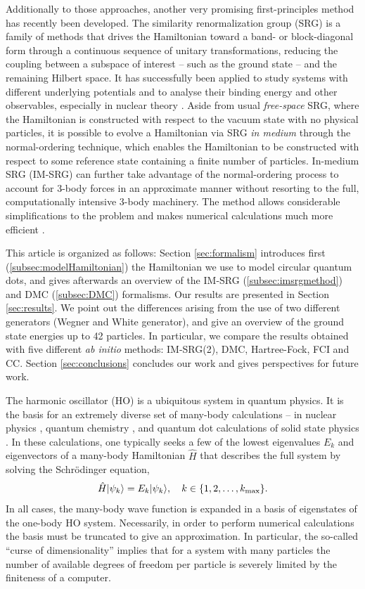 Additionally to those approaches, another very promising first-principles
method has recently been developed.  The similarity renormalization group
(SRG) is a family of methods that drives the Hamiltonian toward a band- or
block-diagonal form through a continuous sequence of unitary transformations,
reducing the coupling between a subspace of interest -- such as the ground
state -- and the remaining Hilbert space.  It has successfully been applied to
study systems with different underlying potentials and to analyse their
binding energy and other observables, especially in nuclear theory
\cite{ScottSRG,PhysRevC.75.061001,SRGThreeDim}.  Aside from usual
\emph{free-space} SRG, where the Hamiltonian is constructed with respect to
the vacuum state with no physical particles, it is possible to evolve a
Hamiltonian via SRG \emph{in medium} through the normal-ordering technique,
which enables the Hamiltonian to be constructed with respect to some reference
state containing a finite number of particles.  In-medium SRG (IM-SRG) can
further take advantage of the normal-ordering process to account for 3-body
forces in an approximate manner without resorting to the full, computationally
intensive 3-body machinery.  The method allows considerable simplifications to
the problem and makes numerical calculations much more efficient \cite{IMSRG}.

This article is organized as follows: Section \ref{sec:formalism} introduces
first (\ref{subsec:modelHamiltonian}) the Hamiltonian we use to model circular
quantum dots, and gives afterwards an overview of the IM-SRG
(\ref{subsec:imsrgmethod}) and DMC (\ref{subsec:DMC}) formalisms.  Our results are
presented in Section \ref{sec:results}.  We point out the differences arising
from the use of two different generators (Wegner and White generator), and
give an overview of the ground state energies up to 42 particles. In
particular, we compare the results obtained with five different \textit{ab
  initio} methods: IM-SRG(2), DMC, Hartree-Fock, FCI and CC. Section
\ref{sec:conclusions} concludes our work and gives perspectives for future
work.

The harmonic oscillator (HO) is a ubiquitous system in quantum physics. It is the basis for an extremely diverse set of many-body calculations -- in nuclear physics \cite{HJORTHJENSEN1995125}, quantum chemistry \cite{helgaker2000molecular}, and quantum dot calculations of solid state physics \cite{reimann2002}. In these calculations, one typically seeks a few of the lowest eigenvalues $E_k$ and eigenvectors of a many-body Hamiltonian $\hat{H}$ that describes the full system by solving the Schr\"odinger equation,
\begin{equation*}
\hat{H} | \psi_k \rangle = E_k | \psi_k \rangle, \quad k \in \{1, 2, \ldots, k_{\text{max}}\}.
\end{equation*}
In all cases, the many-body wave function is expanded in a basis of
eigenstates of the one-body HO system.  Necessarily, in order to perform
numerical calculations the basis must be truncated to give an approximation.
In particular, the so-called ``curse of dimensionality'' implies that for a
system with many particles the number of available degrees of freedom per
particle is severely limited by the finiteness of a computer.

